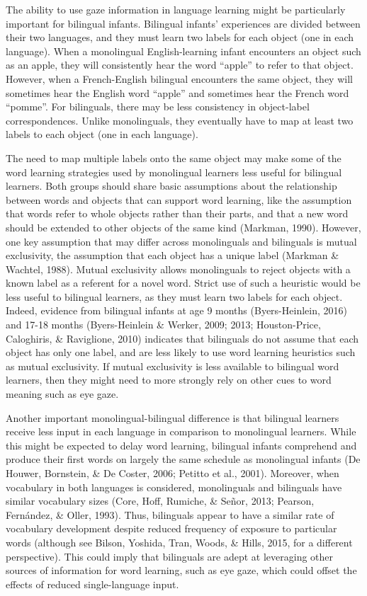 \documentclass[,man,floatsintext]{apa6}
\begin{document}
The ability to use gaze information in language learning might be particularly important for bilingual infants. Bilingual infants' experiences are divided between their two languages, and they must learn two labels for each object (one in each language). When a monolingual English-learning infant encounters an object such as an apple, they will consistently hear the word \enquote{apple} to refer to that object. However, when a French-English bilingual encounters the same object, they will sometimes hear the English word \enquote{apple} and sometimes hear the French word \enquote{pomme}. For bilinguals, there may be less consistency in object-label correspondences. Unlike monolinguals, they eventually have to map at least two labels to each object (one in each language).

The need to map multiple labels onto the same object may make some of the word learning strategies used by monolingual learners less useful for bilingual learners. Both groups should share basic assumptions about the relationship between words and objects that can support word learning, like the assumption that words refer to whole objects rather than their parts, and that a new word should be extended to other objects of the same kind (Markman, 1990). However, one key assumption that may differ across monolinguals and bilinguals is mutual exclusivity, the assumption that each object has a unique label (Markman \& Wachtel, 1988). Mutual exclusivity allows monolinguals to reject objects with a known label as a referent for a novel word. Strict use of such a heuristic would be less useful to bilingual learners, as they must learn two labels for each object. Indeed, evidence from bilingual infants at age 9 months (Byers-Heinlein, 2016) and 17-18 months (Byers-Heinlein \& Werker, 2009; 2013; Houston-Price, Caloghiris, \& Raviglione, 2010) indicates that bilinguals do not assume that each object has only one label, and are less likely to use word learning heuristics such as mutual exclusivity. If mutual exclusivity is less available to bilingual word learners, then they might need to more strongly rely on other cues to word meaning such as eye gaze.

Another important monolingual-bilingual difference is that bilingual learners receive less input in each language in comparison to monolingual learners. While this might be expected to delay word learning, bilingual infants comprehend and produce their first words on largely the same schedule as monolingual infants (De Houwer, Bornstein, \& De Coster, 2006; Petitto et al., 2001). Moreover, when vocabulary in both languages is considered, monolinguals and bilinguals have similar vocabulary sizes (Core, Hoff, Rumiche, \& Señor, 2013; Pearson, Fernández, \& Oller, 1993). Thus, bilinguals appear to have a similar rate of vocabulary development despite reduced frequency of exposure to particular words (although see Bilson, Yoshida, Tran, Woods, \& Hills, 2015, for a different perspective). This could imply that bilinguals are adept at leveraging other sources of information for word learning, such as eye gaze, which could offset the effects of reduced single-language input.
\end{document}
